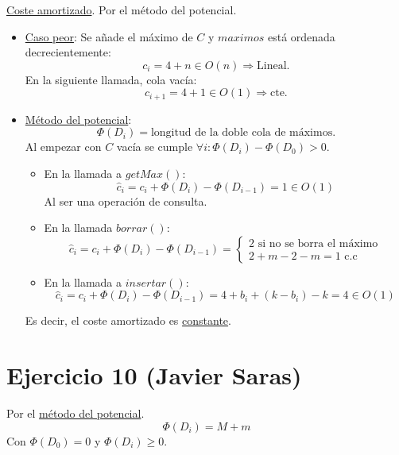 \documentclass[10pt,a4paper,openright]{book}
\theoremstyle{break}
\begin{document}
\underline{Coste amortizado}. Por el método del potencial.
\begin{itemize}
    \item \underline{Caso peor}: Se añade el máximo de $C$ y $maximos$ está ordenada decrecientemente:
    \[
    c_i = 4 + n \in O\left( n \right) \Rightarrow \text{Lineal.} 
    \]
    En la siguiente llamada, cola vacía: 
    \[
    c_{i+1} = 4 + 1 \in O\left( 1 \right) \Rightarrow \text{cte.} 
    \]
    \item \underline{Método del potencial}: 
    \[
    \Phi\left( D_i \right) = \text{longitud de la doble cola de máximos.} 
    \]
    Al empezar con $C$ vacía se cumple $\forall i: \Phi\left( D_i \right) - \Phi\left( D_{0} \right) > 0$.
    \begin{itemize}
        \item En la llamada a $getMax\left( \right)$: 
        \[
        \hat{c}_i = c_i + \Phi\left( D_i \right) - \Phi\left( D_{i-1} \right) = 1 \in O\left( 1 \right)
        \] Al ser una operación de consulta.
        \item En la llamada $borrar\left(  \right)$: 
        \[
        \hat{c}_i = c_i + \Phi\left( D_i \right) - \Phi\left( D_{i-1} \right) = \begin{cases}
            2 \text{ si no se borra el máximo}\\
            2 + m - 2 -m = 1 \text{ c.c} 
        \end{cases} 
        \]
        \item En la llamada a $insertar\left( \right)$:
        \[
        \hat{c}_i = c_i + \Phi\left( D_i \right) - \Phi\left( D_{i-1} \right) = 4 + b_i + \left( k - b_i \right) - k = 4 \in O\left( 1 \right)
        \]
    \end{itemize}
    Es decir, el coste amortizado es \underline{constante}.
\end{itemize}

\section{Ejercicio 10 (Javier Saras)}%
\label{sec:ejercicio_10}
Por el \underline{método del potencial}. 
\[
\Phi\left( D_i \right) = M + m
\]
Con $\Phi\left( D_0 \right) = 0$ y $\Phi\left( D_i \right) \ge 0$.
\end{document}
